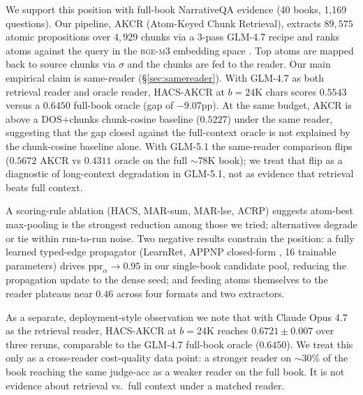 \documentclass{article}
\theoremstyle{plain}
\theoremstyle{definition}
\theoremstyle{remark}
\begin{document}
We support this position with full-book NarrativeQA
\citep{kovcisky2018narrativeqa} evidence (40 books, 1{,}169 questions). Our
pipeline, AKCR (Atom-Keyed Chunk Retrieval), extracts $89{,}575$ atomic
propositions over $4{,}929$ chunks via a 3-pass GLM-4.7 recipe and ranks
atoms against the query in the \textsc{bge-m3} embedding space
\citep{xiao2023bgem3}. Top atoms are mapped back to source chunks via
$\sigma$ and the chunks are fed to the reader. Our main empirical claim is
same-reader (\S\ref{sec:samereader}). With GLM-4.7 as both retrieval reader
and oracle reader, HACS-AKCR at $b\!=\!24$K chars scores $0.5543$ versus a
$0.6450$ full-book oracle (gap of $-9.07$pp). At the same budget, AKCR is
above a DOS+chunks chunk-cosine baseline ($0.5227$) under the same reader,
suggesting that the gap closed against the full-context oracle is not
explained by the chunk-cosine baseline alone. With GLM-5.1 the same-reader
comparison flips ($0.5672$ AKCR vs $0.4311$ oracle on the full $\sim$78K
book); we treat that flip as a diagnostic of long-context degradation in
GLM-5.1, not as evidence that retrieval beats full context.

A scoring-rule ablation (HACS, MAR-sum, MAR-lse, ACRP) suggests atom-best
max-pooling is the strongest reduction among those we tried; alternatives
degrade or tie within run-to-run noise. Two negative results constrain the
position: a fully learned typed-edge propagator (LearnRet, APPNP closed-form
\citep{klein2024appnp}, 16 trainable parameters) drives
$\mathrm{ppr}_\alpha\!\to\!0.95$ in our single-book candidate pool, reducing
the propagation update to the dense seed; and feeding atoms themselves to
the reader plateaus near $0.46$ across four formats and two extractors.

As a separate, deployment-style observation we note that with Claude Opus
4.7 as the retrieval reader, HACS-AKCR at $b\!=\!24$K reaches
$0.6721 \pm 0.007$ over three reruns, comparable to the GLM-4.7 full-book
oracle ($0.6450$). We treat this only as a cross-reader cost-quality data
point: a stronger reader on $\sim$30\% of the book reaching the same
judge-acc as a weaker reader on the full book. It is not evidence about
retrieval vs.\ full context under a matched reader.
\end{document}

